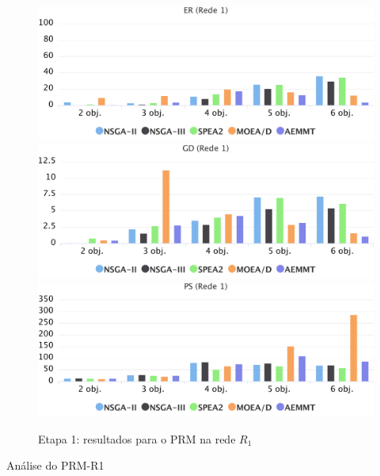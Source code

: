 \begin{figure}[!htbp]
	\caption{Etapa 1: resultados para o PRM na rede $R_1$}
	\label{fig_exp1_mrp_r1}
	\includegraphics[width=1\textwidth]{cap_experimentos/figs/etapa1/er-mrp-r1}
	\includegraphics[width=1\textwidth]{cap_experimentos/figs/etapa1/gd-mrp-r1}
	\includegraphics[width=1\textwidth]{cap_experimentos/figs/etapa1/ps-mrp-r1}
\end{figure}

Análise do PRM-R1

